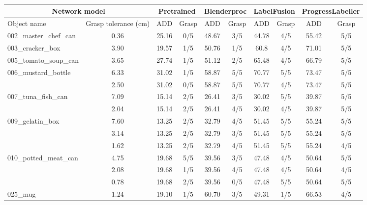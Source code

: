 \begin{table*}
  \centering
\small
  \begin{tabular}{@{}lccccccccc@{}}
    \toprule
    \multicolumn{2}{c}{Network model}  & \multicolumn{2}{c}{Pretrained} & \multicolumn{2}{c}{Blenderproc}& \multicolumn{2}{c}{LabelFusion} & \multicolumn{2}{c}{ProgressLabeller} \\
    \midrule
    Object name & Grasp tolerance (cm) & ADD & Grasp   & ADD & Grasp  & ADD & Grasp   & ADD & Grasp \\
    \midrule
    002\_master\_chef\_can      & 0.36 & 25.16 & 0/5 & 48.67 & 3/5  & 44.78 & 4/5 & 55.42 & 5/5\\
    \midrule
    003\_cracker\_box           & 3.90 & 19.57 & 1/5 & 50.76 & 1/5  & 60.8 & 4/5 & 71.01 & 5/5\\
    \midrule
    005\_tomato\_soup\_can      & 3.65 & 27.74 & 1/5 & 51.12 & 2/5  & 65.48 & 4/5 & 66.79 & 5/5\\
    \midrule
    006\_mustard\_bottle        & 6.33 & 31.02 & 1/5 & 58.87 & 5/5  & 70.77 & 5/5 & 73.47 & 5/5\\
                                & 2.50 & 31.02 & 0/5 & 58.87 & 5/5  & 70.77 & 4/5 & 73.47 & 5/5\\
    \midrule
    007\_tuna\_fish\_can        & 7.09 & 15.14 & 2/5 & 26.41 & 3/5  & 30.02 & 5/5 & 39.87 & 5/5\\
                                & 2.04 & 15.14 & 2/5 & 26.41 & 4/5  & 30.02 & 4/5 & 39.87 & 5/5\\
    \midrule
    009\_gelatin\_box           & 7.60 & 13.25 & 2/5 & 32.79 & 4/5  & 51.45 & 5/5 & 55.24 & 5/5\\
                                & 3.14 & 13.25 & 2/5 & 32.79 & 3/5  & 51.45 & 5/5 & 55.24 & 5/5\\
                                & 1.62 & 13.25 & 2/5 & 32.79 & 4/5  & 51.45 & 5/5 & 55.24 & 4/5\\
    \midrule
    010\_potted\_meat\_can      & 4.75 & 19.68 & 5/5 & 39.56 & 3/5  & 47.48 & 4/5 & 50.64 & 5/5\\
                                & 2.08 & 19.68 & 1/5 & 39.56 & 4/5  & 47.48 & 4/5 & 50.64 & 4/5\\
                                & 0.78 & 19.68 & 2/5 & 39.56 & 0/5  & 47.48 & 5/5 & 50.64 & 5/5\\
    \midrule
    025\_mug                    & 1.24 & 19.10 & 1/5 & 60.70 & 3/5  & 49.31 & 1/5 & 66.53 & 4/5\\
                                

\end{tabular}
\end{table*}
